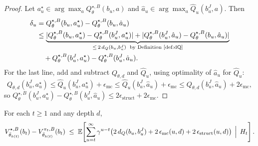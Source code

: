 \begin{proof}
Let $a_u^\star\in\arg\max_a Q_{\theta}^{\star,B}(b_u,a)$ and $\hat a_u\in\arg\max_a \widehat Q_u(b_u^J,a)$. Then
\begin{align*}
\delta_u
&=Q_{\theta}^{\star,B}(b_u,a_u^\star)-Q_{\theta}^{\star,B}(b_u,\hat a_u)\\
&\le \underbrace{|Q_{\theta}^{\star,B}(b_u,a_u^\star)-Q_{\theta}^{\star,B}(b_u^J,a_u^\star)|+|Q_{\theta}^{\star,B}(b_u^J,\hat a_u)-Q_{\theta}^{\star,B}(b_u,\hat a_u)|}_{\le\, 2\,d_Q(b_u,b_u^J) \;\text{ by Definition~\ref{def:dQ}}}\\
&\quad+Q_{\theta}^{\star,B}(b_u^J,a_u^\star)-Q_{\theta}^{\star,B}(b_u^J,\hat a_u).
\end{align*}
For the last line, add and subtract $Q_{\theta,d}$ and $\widehat Q_u$, using optimality of $\hat a_u$ for $\widehat Q_u$:
\[
Q_{\theta,d}(b_u^J,a_u^\star)
\le \widehat Q_u(b_u^J,a_u^\star)+\epsilon_{\mathrm{mc}}
\le \widehat Q_u(b_u^J,\hat a_u)+\epsilon_{\mathrm{mc}}
\le Q_{\theta,d}(b_u^J,\hat a_u)+2\epsilon_{\mathrm{mc}},
\]
so $Q_{\theta}^{\star,B}(b_u^J,a_u^\star)-Q_{\theta}^{\star,B}(b_u^J,\hat a_u)\le 2\epsilon_{\mathrm{struct}}+2\epsilon_{\mathrm{mc}}$.
\end{proof}


\begin{thm}\label{thm:planning_state_bound}
For each $t\ge 1$ and any depth $d$,
\[
V_{\bar\theta_{k(t)}}^{\star,B}(b_t)-V_{\bar\theta_{k(t)}}^{\pi_t,B}(b_t)
\;\le\;
\mathbb{E}\!\left[\sum_{u=t}^\infty \gamma^{u-t}\bigl(2\,d_Q(b_u,b_u^J)
+2\,\epsilon_{\mathrm{mc}}(u,d)+2\,\epsilon_{\mathrm{struct}}(u,d)\bigr)\,\Bigm|\,H_t\right].
\]
\end{thm}

